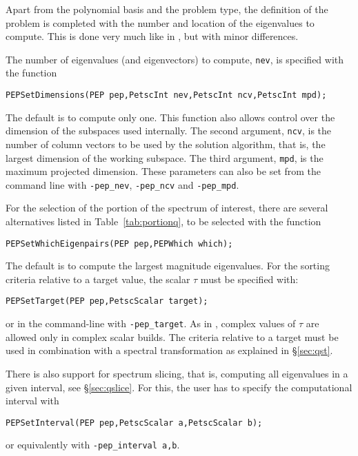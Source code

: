 Apart from the polynomial basis and the problem type, the definition of the problem is completed with the number and location of the eigenvalues to compute. This is done very much like in , but with minor differences.

The number of eigenvalues (and eigenvectors) to compute, \texttt{nev}, is specified with the function%
	\begin{Verbatim}[fontsize=\small]
	PEPSetDimensions(PEP pep,PetscInt nev,PetscInt ncv,PetscInt mpd);
	\end{Verbatim}
The default is to compute only one. This function also allows control over the dimension of the subspaces used internally. The second argument, \texttt{ncv}, is the number of column vectors to be used by the solution algorithm, that is, the largest dimension of the working subspace. The third argument, \texttt{mpd}, is the maximum projected dimension. These parameters can also be set from the command line with \Verb!-pep_nev!, \Verb!-pep_ncv! and \Verb!-pep_mpd!.

For the selection of the portion of the spectrum of interest, there are several alternatives listed in Table~\ref{tab:portionq}, to be selected with the function
	\begin{Verbatim}[fontsize=\small]
	PEPSetWhichEigenpairs(PEP pep,PEPWhich which);
	\end{Verbatim}
The default is to compute the largest magnitude eigenvalues.
For the sorting criteria relative to a target value, the scalar $\tau$ must be specified with:
	\begin{Verbatim}[fontsize=\small]
	PEPSetTarget(PEP pep,PetscScalar target);
	\end{Verbatim}
or in the command-line with \Verb!-pep_target!. As in , complex values of $\tau$ are allowed only in complex scalar \slepc builds. The criteria relative to a target must be used in combination with a spectral transformation as explained in \S\ref{sec:qst}.

There is also support for spectrum slicing, that is, computing all eigenvalues in a given interval, see \S\ref{sec:qslice}. For this, the user has to specify the computational interval with
	\begin{Verbatim}[fontsize=\small]
	PEPSetInterval(PEP pep,PetscScalar a,PetscScalar b);
	\end{Verbatim}
or equivalently with \Verb!-pep_interval a,b!.

